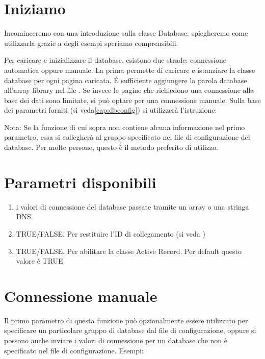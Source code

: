 \label{class:dbconnection}
\section*{Iniziamo}
Incominceremo con una introduzione sulla classe Database: spiegheremo come utilizzarla grazie a degli esempi speriamo comprensibili.

Per caricare e inizializzare il database, esistono due strade: connessione automatica oppure manuale. La prima permette di caricare e istanziare la classe database per ogni pagina caricata. \'E sufficiente aggiungere la parola database all'array library nel file . Se invece le pagine che richiedono una connessione alla base dei dati sono limitate, si può optare per una connessione manuale. Sulla base dei parametri forniti (si veda\vref{cap:dbconfig}) si utilizzerà l'istruzione:


Nota: Se la funzione di cui sopra non contiene alcuna informazione nel primo parametro, essa si collegherà al gruppo specificato nel file di configurazione del database. Per molte persone, questo è il metodo preferito di utilizzo.

\section*{Parametri disponibili}
\begin{enumerate}
\item i valori di connessione del database passate tramite un array o una stringa \ac{DNS}
\item TRUE/FALSE. Per restituire l'ID di collegamento (si veda )
\item TRUE/FALSE. Per abilitare la classe Active Record. Per default questo valore è TRUE
\end{enumerate}

\section*{Connessione manuale}
Il primo parametro di questa funzione può opzionalmente essere utilizzato per specificare un particolare gruppo di database dal file di configurazione, oppure si possono anche inviare i valori di connessione per un database che non è specificato nel file di configurazione. Esempi:

